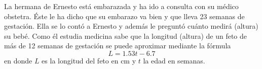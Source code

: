 
\label{ques:longitud_emb}
La hermana de Ernesto está embarazada y ha ido a consulta con su médico obstetra.
Éste le ha dicho que su embarazo va bien y que lleva 23 semanas de gestación.
Ella se lo contó a Ernesto y además le preguntó cuánto medirá (altura) su bebé.
Como él estudia medicina sabe que la longitud (altura) de un feto de más
de 12 semanas de gestación se puede aproximar mediante la fórmula
\begin{equation}\label{eq:longitud_emb}
    L = 1.53t - 6.7
\end{equation}
en donde $L$ es la longitud del feto en cm y $t$ la edad en semanas.

